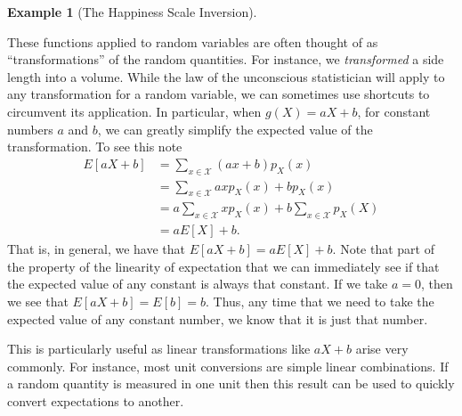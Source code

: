 \documentclass[
  letterpaper,
  DIV=11,
  numbers=noendperiod]{scrreprt}
\theoremstyle{definition}
\theoremstyle{definition}
\newtheorem{example}{Example}[chapter]
\theoremstyle{definition}
\theoremstyle{remark}
\begin{document}
\begin{example}[The Happiness Scale
Inversion]
\begin{tcolorbox}[enhanced jigsaw, colback=white, colframe=quarto-callout-color-frame, arc=.35mm, leftrule=.75mm, rightrule=.15mm, opacityback=0, breakable, bottomrule=.15mm, left=2mm, toprule=.15mm]
\end{tcolorbox}

\end{example}

These functions applied to random variables are often thought of as
``transformations'' of the random quantities. For instance, we
\emph{transformed} a side length into a volume. While the law of the
unconscious statistician will apply to any transformation for a random
variable, we can sometimes use shortcuts to circumvent its application.
In particular, when \(g(X) = aX + b\), for constant numbers \(a\) and
\(b\), we can greatly simplify the expected value of the transformation.
To see this note \begin{align*}
E[aX + b] &= \sum_{x\in\mathcal{X}}(ax + b)p_X(x) \\
&= \sum_{x\in\mathcal{X}}axp_X(x) + bp_X(x) \\
&= a\sum_{x\in\mathcal{X}}xp_X(x) + b\sum_{x\in\mathcal{X}}p_X(X) \\
&= aE[X] + b.
\end{align*} That is, in general, we have that
\(E[aX + b] = aE[X] + b\). Note that part of the property of the
linearity of expectation that we can immediately see if that the
expected value of any constant is always that constant. If we take
\(a = 0\), then we see that \(E[aX + b] = E[b] = b\). Thus, any time
that we need to take the expected value of any constant number, we know
that it is just that number.

This is particularly useful as linear transformations like \(aX+b\)
arise very commonly. For instance, most unit conversions are simple
linear combinations. If a random quantity is measured in one unit then
this result can be used to quickly convert expectations to another.
\end{document}

